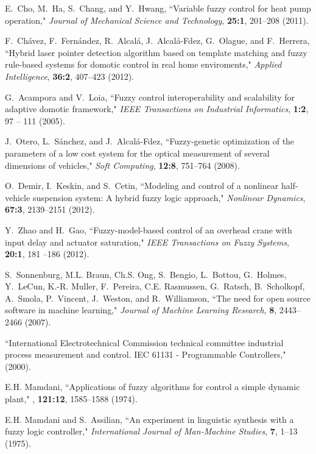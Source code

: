 \documentclass[11pt,twoside]{article}
\begin{document}
\begin{multicols}{2}
\begin{thebibliography}{10}
E.~Cho, M.~Ha, S.~Chang, and Y.~Hwang,
\newblock ``Variable fuzzy control for heat pump operation," {\it Journal of Mechanical Science and Technology}, {\bf 25:1}, 201--208
  (2011).

F.~Ch{\'a}vez, F.~Fern{\'a}ndez, R.~Alcal{\'a}, J.~Alcal{\'a}-Fdez, G.~Olague,
  and F.~Herrera,
\newblock ``Hybrid laser pointer detection algorithm based on template matching
  and fuzzy rule-based systems for domotic control in real home enviroments," {\it Applied Intelligence}, {\bf 36:2}, 407--423 (2012).

G.~Acampora and V.~Loia,
\newblock ``Fuzzy control interoperability and scalability for adaptive domotic
  framework," {\it IEEE Transactions on Industrial Informatics}, {\bf 1:2}, 97 -- 111
  (2005).

J.~Otero, L.~S\'anchez, and J.~Alcal\'a-Fdez,
\newblock ``Fuzzy-genetic optimization of the parameters of a low cost system for
  the optical measurement of several dimensions of vehicles," {\it Soft Computing}, {\bf 12:8}, 751--764 (2008).

O.~Demir, I.~Keskin, and S.~Cetin,
\newblock ``Modeling and control of a nonlinear half-vehicle suspension system: A
  hybrid fuzzy logic approach," {\it Nonlinear Dynamics}, {\bf 67:3}, 2139--2151 (2012).

Y.~Zhao and H.~Gao,
\newblock ``Fuzzy-model-based control of an overhead crane with input delay and
  actuator saturation," {\it IEEE Transactions on Fuzzy Systems}, {\bf 20:1}, 181 --186 (2012).

S.~Sonnenburg, M.L. Braun, Ch.S. Ong, S.~Bengio, L.~Bottou, G.~Holmes,
  Y.~LeCun, K.-R. Muller, F.~Pereira, C.E. Rasmussen, G.~Ratsch, B.~Scholkopf,
  A.~Smola, P.~Vincent, J.~Weston, and R.~Williamson,
\newblock ``The need for open source software in machine learning," {\it Journal of Machine Learning Research}, {\bf 8}, 2443--2466 (2007).

``International Electrotechnical Commission technical committee industrial
  process measurement and control. IEC 61131 - Programmable Controllers,"
 (2000).

E.H. Mamdani,
\newblock ``Applications of fuzzy algorithms for control a simple dynamic plant,"
,
  {\bf 121:12}, 1585--1588 (1974).

E.H. Mamdani and S.~Assilian,
\newblock ``An experiment in linguistic synthesis with a fuzzy logic controller," {\it International Journal of Man-Machine Studies}, {\bf 7}, 1--13 (1975).


\end{thebibliography}
\end{multicols}
\end{document}
